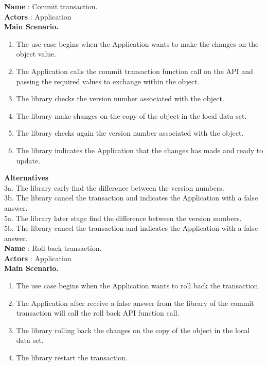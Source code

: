 \documentclass[12pt]{article}
\begin{document}
{\textbf{Name} : Commit transaction.\\
\textbf{Actors} : Application\\
\textbf{Main Scenario.}
\begin{enumerate}
  \item The use case begins when the Application wants to make the changes on the object value.
  \item The Application calls the commit transaction function call on the API and passing the required values to exchange within the object.
  \item The library checks the version number associated with the object.
  \item The library make changes on the copy of the object in the local data set.
  \item The library checks again the version number associated with the object. 
  \item The library indicates the Application that the changes has made and ready to update.
\end{enumerate}
\textbf{Alternatives}\\
3a. The library early find the difference between the version numbers.\\
3b. The library cancel the transaction and indicates the Application with a false answer.\\
5a. The library later stage find the difference between the version numbers.\\
5b. The library cancel the transaction and indicates the Application with a false answer.\\


\textbf{Name} : Roll-back transaction.\\
\textbf{Actors} : Application\\
\textbf{Main Scenario.}
\begin{enumerate}
  \item The use case begins when the Application wants to roll back the transaction.
  \item The Application after receive a false answer from the library of the commit transaction will call the roll back API function call.
  \item The library rolling back the changes on the copy of the object in the local data set.
  \item The library restart the transaction. 
\end{enumerate}


}
\end{document}
